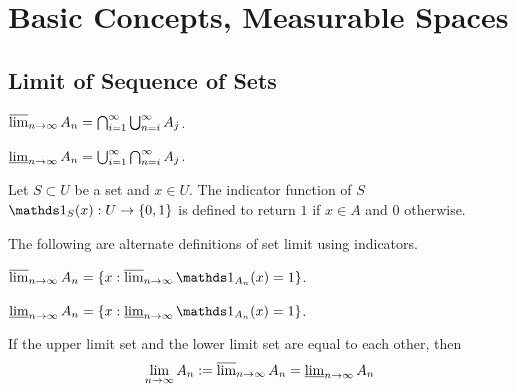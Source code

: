 \documentclass[class=book, crop=false]{standalone}
\begin{document}
    \section{Basic Concepts, Measurable Spaces}
        \subsection{Limit of Sequence of Sets}
        \begin{definition}
            $\operatorname{\overline{\lim}}_{n \rightarrow \infty} A_n = \bigcap^{\infty}_{i = 1} \bigcup^{\infty}_{n = i} A_j$.
        \end{definition}
        
        \begin{definition}
            $\operatorname{\underline{\lim}}_{n \rightarrow \infty} A_n = \bigcup^{\infty}_{i = 1} \bigcap^{\infty}_{n = i} A_j$.
        \end{definition}
        
        \begin{definition}
            Let $S \subset U$ be a set and $x \in U$. The indicator function of $S$ $\indic_S(x) : U \rightarrow \{0, 1\}$ is defined to return $1$ if $x \in A$ and $0$ otherwise.
        \end{definition}
        
        \noindent The following are alternate definitions of set limit using indicators.
        \begin{theorem}
            $\uplim_{n \rightarrow \infty} A_n = \{x : \uplim_{n \rightarrow \infty} \indic_{A_n}(x) = 1\}$.
        \end{theorem}
        
        \begin{theorem}
            $\lowlim_{n \rightarrow \infty} A_n = \{x : \lowlim_{n \rightarrow \infty} \indic_{A_n}(x) = 1\}$.
        \end{theorem}

        \begin{theorem}[Existence of Limit for $\{A_n\}^{\infty}_{n = 1}$]
            If the upper limit set and the lower limit set are equal to each other, then
            \begin{equation*}
                \lim_{n \rightarrow \infty} A_n := \operatorname{\overline{\lim}}_{n \rightarrow \infty} A_n = \operatorname{\underline{\lim}}_{n \rightarrow \infty} A_n
            \end{equation*}
        \end{theorem}
        
\end{document}
